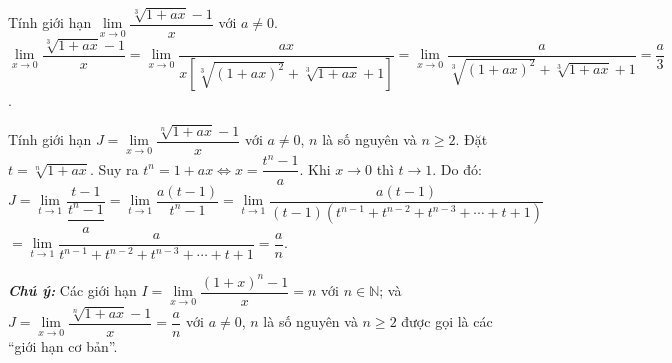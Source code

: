 \begin{vd}%
Tính giới hạn $\lim\limits_{x \to 0} \dfrac{\sqrt[3]{1 + ax} - 1}{x}$ với $a \neq 0$.
\loigiai
{
$\lim\limits_{x \to 0} \dfrac{\sqrt[3]{1 + ax} - 1}{x} = \lim\limits_{x \to 0} \dfrac{ax}{x\left[\sqrt[3]{(1 + ax)^2} + \sqrt[3]{1 + ax} +1\right]} = \lim\limits_{x \to 0} \dfrac{a}{\sqrt[3]{(1 + ax)^2} + \sqrt[3]{1 + ax} + 1} = \dfrac{a}{3}$.
}
\end{vd}


\begin{vd}%
Tính giới hạn $J = \lim\limits_{x \to 0} \dfrac{\sqrt[n]{1 + ax} - 1}{x}$ với $a\neq 0$, $n$ là số nguyên và $n \geq 2$.
\loigiai
{
Đặt $t = \sqrt[n]{1 + ax}$. Suy ra $t^n = 1 + ax \Leftrightarrow x = \dfrac{t^n - 1}{a}$. Khi $x \to 0$ thì $t \to 1$. Do đó:\\
$J = \lim\limits_{t \to 1} \dfrac{t - 1}{\dfrac{t^n - 1}{a}} = \lim\limits_{t \to 1} \dfrac{a(t-1)}{t^n - 1} = \lim\limits_{t \to 1} \dfrac{a(t - 1)}{(t - 1)\left(t^{n-1} + t^{n-2} + t^{n-3} + \cdots + t + 1\right)}$\\
$= \lim\limits_{t \to 1} \dfrac{a}{t^{n-1} + t^{n-2} + t^{n-3} + \cdots + t + 1} = \dfrac{a}{n}$.
}
\end{vd}

\begin{note}
\textbf{\textit{Chú ý:}} Các giới hạn $I = \lim\limits_{x \to 0} \dfrac{(1+x)^{n} - 1}{x} = n$ với $n \in \mathbb{N}$; và $J = \lim\limits_{x \to 0} \dfrac{\sqrt[n]{1 + ax} - 1}{x} = \dfrac{a}{n}$ với $a\neq 0$, $n$ là số nguyên và $n \geq 2$ được gọi là các ``giới hạn cơ bản''.
\end{note}


